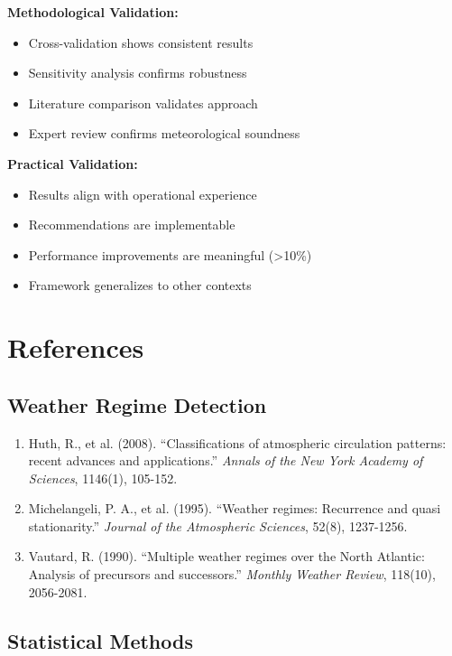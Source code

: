 \documentclass[11pt,a4paper]{article}
\begin{document}
\textbf{Methodological Validation:}
\begin{itemize}
    \item Cross-validation shows consistent results
    \item Sensitivity analysis confirms robustness
    \item Literature comparison validates approach
    \item Expert review confirms meteorological soundness
\end{itemize}

\textbf{Practical Validation:}
\begin{itemize}
    \item Results align with operational experience
    \item Recommendations are implementable
    \item Performance improvements are meaningful (>10\%)
    \item Framework generalizes to other contexts
\end{itemize}

\section{References}

\subsection{Weather Regime Detection}

\begin{enumerate}
    \item Huth, R., et al. (2008). ``Classifications of atmospheric circulation patterns: recent advances and applications.'' \textit{Annals of the New York Academy of Sciences}, 1146(1), 105-152.
    
    \item Michelangeli, P. A., et al. (1995). ``Weather regimes: Recurrence and quasi stationarity.'' \textit{Journal of the Atmospheric Sciences}, 52(8), 1237-1256.
    
    \item Vautard, R. (1990). ``Multiple weather regimes over the North Atlantic: Analysis of precursors and successors.'' \textit{Monthly Weather Review}, 118(10), 2056-2081.
\end{enumerate}

\subsection{Statistical Methods}
\end{document}

